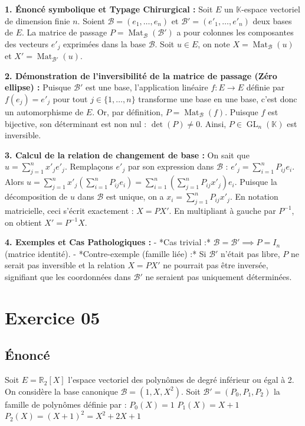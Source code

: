 \documentclass{report}
\begin{document}
\textbf{1. Énoncé symbolique et Typage Chirurgical :}
Soit $E$ un $\mathbb{K}$-espace vectoriel de dimension finie $n$. Soient $\mathcal{B} = (e_1, \dots, e_n)$ et $\mathcal{B}' = (e'_1, \dots, e'_n)$ deux bases de $E$.
La matrice de passage $P = \operatorname{Mat}_{\mathcal{B}}(\mathcal{B}')$ a pour colonnes les composantes des vecteurs $e'_j$ exprimées dans la base $\mathcal{B}$.
Soit $u \in E$, on note $X = \operatorname{Mat}_{\mathcal{B}}(u)$ et $X' = \operatorname{Mat}_{\mathcal{B}'}(u)$.

\textbf{2. Démonstration de l'inversibilité de la matrice de passage (Zéro ellipse) :}
Puisque $\mathcal{B}'$ est une base, l'application linéaire $f : E \to E$ définie par $f(e_j) = e'_j$ pour tout $j \in \{1, \dots, n\}$ transforme une base en une base, c'est donc un automorphisme de $E$.
Or, par définition, $P = \operatorname{Mat}_{\mathcal{B}}(f)$.
Puisque $f$ est bijective, son déterminant est non nul : $\det(P) \neq 0$.
Ainsi, $P \in \operatorname{GL}_n(\mathbb{K})$ est inversible.

\textbf{3. Calcul de la relation de changement de base :}
On sait que $u = \sum_{j=1}^n x'_j e'_j$.
Remplaçons $e'_j$ par son expression dans $\mathcal{B}$ : $e'_j = \sum_{i=1}^n P_{ij} e_i$.
Alors $u = \sum_{j=1}^n x'_j \left( \sum_{i=1}^n P_{ij} e_i \right) = \sum_{i=1}^n \left( \sum_{j=1}^n P_{ij} x'_j \right) e_i$.
Puisque la décomposition de $u$ dans $\mathcal{B}$ est unique, on a $x_i = \sum_{j=1}^n P_{ij} x'_j$.
En notation matricielle, ceci s'écrit exactement : $X = P X'$.
En multipliant à gauche par $P^{-1}$, on obtient $X' = P^{-1} X$.

\textbf{4. Exemples et Cas Pathologiques :}
- *Cas trivial :* $\mathcal{B} = \mathcal{B}' \implies P = I_n$ (matrice identité).
- *Contre-exemple (famille liée) :* Si $\mathcal{B}'$ n'était pas libre, $P$ ne serait pas inversible et la relation $X = P X'$ ne pourrait pas être inversée, signifiant que les coordonnées dans $\mathcal{B}'$ ne seraient pas uniquement déterminées.


\section*{Exercice 05}
\subsection*{Énoncé}
Soit $E = \mathbb{R}_2[X]$ l'espace vectoriel des polynômes de degré inférieur ou égal à 2.
On considère la base canonique $\mathcal{B} = (1, X, X^2)$.
Soit $\mathcal{B}' = (P_0, P_1, P_2)$ la famille de polynômes définie par :
$P_0(X) = 1$
$P_1(X) = X + 1$
$P_2(X) = (X+1)^2 = X^2 + 2X + 1$
\end{document}
